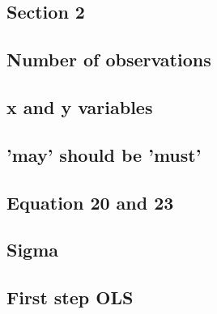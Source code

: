 \documentclass[12pt,english]{scrartcl}
\begin{document}
\subsection{Section 2}

\subsection{Number of observations}

\subsection{x and y variables}

\subsection{'may' should be 'must'}

\subsection{Equation 20 and 23}

\subsection{Sigma}

\subsection{First step OLS}
\end{document}

